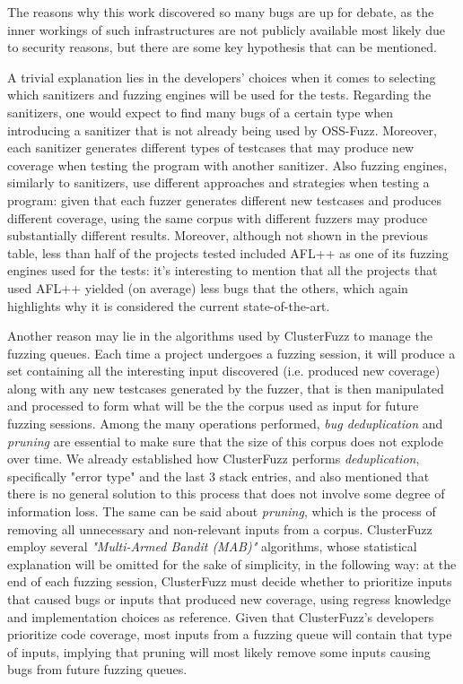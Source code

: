 The reasons why this work discovered so many bugs are up for debate, as the inner workings of such infrastructures are not publicly available most likely due to security reasons, but there are some key hypothesis that can be mentioned.

A trivial explanation lies in the developers' choices when it comes to selecting which sanitizers and fuzzing engines will be used for the tests. Regarding the sanitizers, one would expect to find many bugs of a certain type when introducing a sanitizer that is not already being used by OSS-Fuzz. Moreover, each sanitizer generates different types of testcases that may produce new coverage when testing the program with another sanitizer. Also fuzzing engines, similarly to sanitizers, use different approaches and strategies when testing a program: given that each fuzzer generates different new testcases and produces different coverage, using the same corpus with different fuzzers may produce substantially different results. Moreover, although not shown in the previous table, less than half of the projects tested included AFL++ as one of its fuzzing engines used for the tests: it's interesting to mention that all the projects that used AFL++ yielded (on average) less bugs that the others, which again highlights why it is considered the current state-of-the-art.

Another reason may lie in the algorithms used by ClusterFuzz to manage the fuzzing queues. Each time a project undergoes a fuzzing session, it will produce a set containing all the interesting input discovered (i.e. produced new coverage) along with any new testcases generated by the fuzzer, that is then manipulated and processed to form what will be the the corpus used as input for future fuzzing sessions. Among the many operations performed, \textit{bug deduplication} and \textit{pruning} are essential to make sure that the size of this corpus does not explode over time. We already established how ClusterFuzz performs \textit{deduplication}, specifically "error type" and the last 3 stack entries, and also mentioned that there is no general solution to this process that does not involve some degree of information loss.
The same can be said about \textit{pruning}, which is the process of removing all unnecessary and non-relevant inputs from a corpus. ClusterFuzz employ several \textit{"Multi-Armed Bandit (MAB)"} \cite{mab} algorithms, whose statistical explanation will be omitted for the sake of simplicity, in the following way: at the end of each fuzzing session, ClusterFuzz must decide whether to prioritize inputs that caused bugs or inputs that produced new coverage, using regress knowledge and implementation choices as reference. Given that ClusterFuzz's developers prioritize code coverage, most inputs from a fuzzing queue will contain that type of inputs, implying that pruning will most likely remove some inputs causing bugs from future fuzzing queues.

